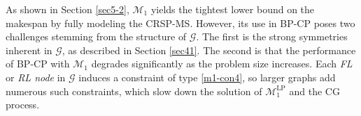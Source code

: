 \documentclass[12pt]{article}
\begin{document}






As shown in Section \ref{sec5-2}, $\mathcal{M}_1$ yields the tightest lower bound on the makespan by fully modeling the CRSP-MS. However, its use in BP-CP poses two challenges stemming from the structure of $\mathcal{G}$. The first is the strong symmetries inherent in $\mathcal{G}$, as described in Section \ref{sec41}. The second is that the performance of BP-CP with $\mathcal{M}_1$ degrades significantly as the problem size increases. Each \textit{FL} or \textit{RL node} in $\mathcal{G}$ induces a constraint of type \eqref{m1-con4}, so larger graphs add numerous such constraints, which slow down the solution of $\mathcal{M}^{\text{LP}}_1$ and the CG process.

\end{document}
